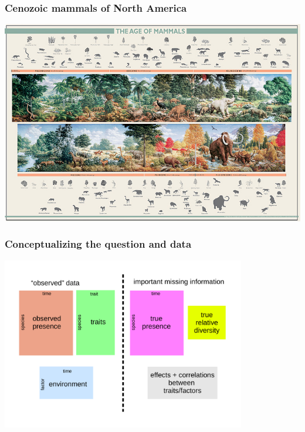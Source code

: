 \documentclass[aspectratio=169]{beamer}
\begin{document}
\begin{frame}
  \frametitle{Cenozoic mammals of North America}
  \begin{center}
    \includegraphics[height=0.775\textheight,width=\textwidth,keepaspectratio=true]{figure/aom}
  \end{center}

  \tiny{}
\end{frame}

%
%

\begin{frame}
  \frametitle{Conceptualizing the question and data}
  \begin{center}
    \includegraphics[width=0.8\textwidth,height=\textheight,keepaspectratio=true]{figure/problem_concept}
  \end{center}
\end{frame}
\end{document}
